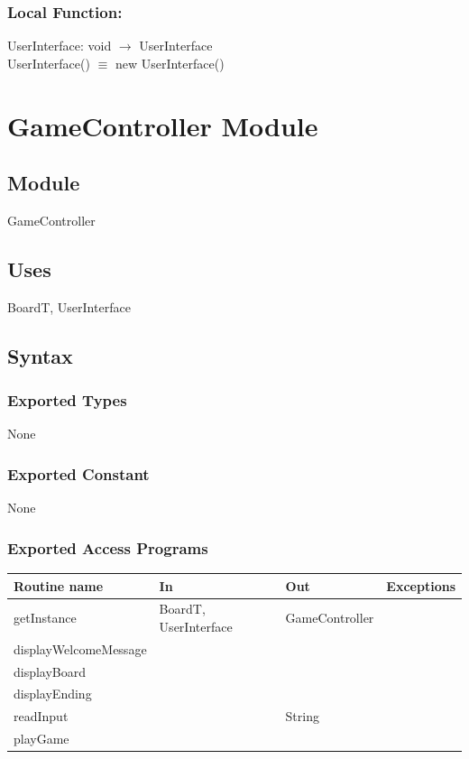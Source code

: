 \documentclass[12pt]{article}
\begin{document}
\subsubsection*{Local Function:}

UserInterface: void $\rightarrow$ UserInterface \\
UserInterface() $\equiv$ new UserInterface()

\newpage

\section* {GameController Module}

\subsection*{Module}
GameController

\subsection* {Uses}
BoardT, UserInterface
\subsection* {Syntax}
\subsubsection* {Exported Types}
None
\subsubsection* {Exported Constant}
None
\subsubsection* {Exported Access Programs}
\begin{tabular}{| l | l | l | l |}
\hline
\textbf{Routine name} & \textbf{In} & \textbf{Out} & \textbf{Exceptions}\\
\hline
getInstance & BoardT, UserInterface & GameController & \\
\hline
displayWelcomeMessage &  &  & \\
\hline
displayBoard &  &  & \\
\hline
displayEnding &  &  & \\
\hline
readInput &  & String & \\
\hline
playGame &  &  & \\
\hline
\end{tabular}
\end{document}

